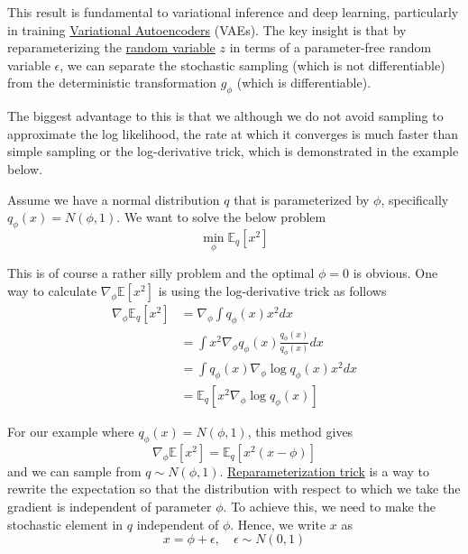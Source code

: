   This result is fundamental to variational inference and deep learning, particularly in training \hyperref[def:variational-autoencoders]{Variational Autoencoders} (VAEs). The key insight is that by reparameterizing the \hyperref[prob-def:random-variable]{random variable} $z$ in terms of a parameter-free random variable $\epsilon$, we can separate the stochastic sampling (which is not differentiable) from the deterministic transformation $g_\phi$ (which is differentiable).

  The biggest advantage to this is that we although we do not avoid sampling to approximate the log likelihood, the rate at which it converges is much faster than simple sampling or the log-derivative trick, which is demonstrated in the example below. 

  \begin{example}[Gradient of Expection of $f(x) = x^2$ w.r.t. Gaussian]
    \label{ex:gradient-of-expection-of-fxx2-w-r-t-gaussian}
    Assume we have a normal distribution $q$ that is parameterized by $\phi$, specifically
    $q_\phi(x) = N(\phi, 1)$. We want to solve the below problem
    \begin{equation}
      \min_\phi \mathbb{E}_q[x^2]
    \end{equation}

    This is of course a rather silly problem and the optimal $\phi = 0$ is obvious. One way to calculate $\nabla_\phi \mathbb{E}[x^2]$ is using the log-derivative trick as follows
    \begin{align}
      \nabla_\phi \mathbb{E}_q[x^2] &= \nabla_\phi\int q_\phi(x)x^2dx \\
      &= \int x^2\nabla_\phi q_\phi(x)\frac{q_\phi(x)}{q_\phi(x)}dx \\
      &= \int q_\phi(x)\nabla_\phi\log q_\phi(x)x^2dx \\
      &= \mathbb{E}_q[x^2\nabla_\phi\log q_\phi(x)]
    \end{align}

    For our example where $q_\phi(x) = N(\phi, 1)$, this method gives
    \begin{equation}
      \nabla_\phi \mathbb{E}[x^2] = \mathbb{E}_q[x^2(x-\phi)]
    \end{equation}
    and we can sample from $q \sim N(\phi, 1)$. \hyperref[thm:reparameterization-trick]{Reparameterization trick} is a way to rewrite the expectation so that the distribution with respect to which we take the gradient is independent of parameter $\phi$. To achieve this, we need to make the stochastic element in $q$ independent of $\phi$. Hence, we write $x$ as
    \begin{equation}
      x = \phi+ \epsilon, \quad \epsilon \sim N(0,1)
    \end{equation}


\end{example}
